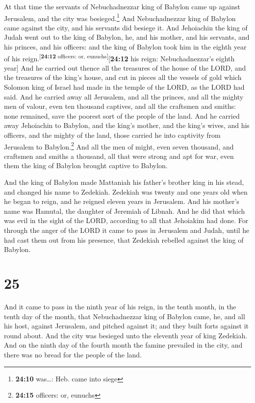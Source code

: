  At that time the servants of Nebuchadnezzar king of
Babylon came up against Jerusalem, and the city was besieged.\footnote{\textbf{24:10}
  was\ldots: Heb. came into siege}  And Nebuchadnezzar
king of Babylon came against the city, and his servants did besiege it.
 And Jehoiachin the king of Judah went out to the king of
Babylon, he, and his mother, and his servants, and his princes, and his
officers: and the king of Babylon took him in the eighth year of his
reign.\textsuperscript{{[}\textbf{24:12} officers: or,
eunuchs{]}}{[}\textbf{24:12} his reign: Nebuchadnezzar's eighth year{]}
 And he carried out thence all the treasures of the house
of the LORD, and the treasures of the king's house, and cut in pieces
all the vessels of gold which Solomon king of Israel had made in the
temple of the LORD, as the LORD had said.  And he carried
away all Jerusalem, and all the princes, and all the mighty men of
valour, even ten thousand captives, and all the craftsmen and smiths:
none remained, save the poorest sort of the people of the land.
 And he carried away Jehoiachin to Babylon, and the
king's mother, and the king's wives, and his officers, and the mighty of
the land, those carried he into captivity from Jerusalem to
Babylon.\footnote{\textbf{24:15} officers: or, eunuchs} 
And all the men of might, even seven thousand, and craftsmen and smiths
a thousand, all that were strong and apt for war, even them the king of
Babylon brought captive to Babylon.

 And the king of Babylon made Mattaniah his father's
brother king in his stead, and changed his name to Zedekiah.
 Zedekiah was twenty and one years old when he began to
reign, and he reigned eleven years in Jerusalem. And his mother's name
was Hamutal, the daughter of Jeremiah of Libnah.  And he
did that which was evil in the sight of the LORD, according to all that
Jehoiakim had done.  For through the anger of the LORD it
came to pass in Jerusalem and Judah, until he had cast them out from his
presence, that Zedekiah rebelled against the king of Babylon.

\hypertarget{section-24}{%
\section{25}\label{section-24}}

 And it came to pass in the ninth year of his reign, in
the tenth month, in the tenth day of the month, that Nebuchadnezzar king
of Babylon came, he, and all his host, against Jerusalem, and pitched
against it; and they built forts against it round about. 
And the city was besieged unto the eleventh year of king Zedekiah.
 And on the ninth day of the fourth month the famine
prevailed in the city, and there was no bread for the people of the
land.

